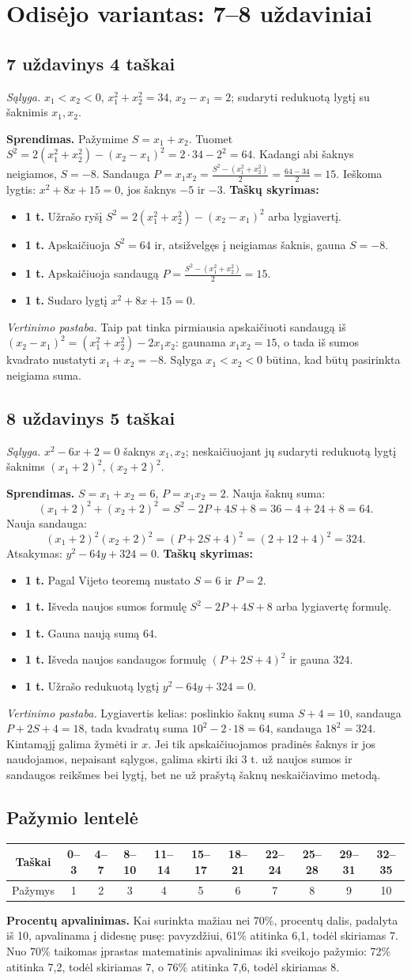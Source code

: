 \documentclass[11pt,a4paper]{article}
\newcommand{\uzd}[3]{\subsection*{#1 uždavinys \hfill #2 taškai}\textit{Sąlyga.} #3\par}
\newcommand{\kriterijai}{\textbf{Taškų skyrimas:}}
\newcommand{\balas}[2]{\item \textbf{#1 t.} #2}
\begin{document}
\section*{Odisėjo variantas: 7--8 uždaviniai}
\uzd{7}{4}{$x_1<x_2<0$, $x_1^2+x_2^2=34$, $x_2-x_1=2$; sudaryti redukuotą lygtį su šaknimis $x_1,x_2$.}
\textbf{Sprendimas.} Pažymime $S=x_1+x_2$. Tuomet $S^2=2(x_1^2+x_2^2)-(x_2-x_1)^2=2\cdot34-2^2=64$. Kadangi abi šaknys neigiamos, $S=-8$. Sandauga $P=x_1x_2=\frac{S^2-(x_1^2+x_2^2)}{2}=\frac{64-34}{2}=15$. Ieškoma lygtis: $x^2+8x+15=0$, jos šaknys $-5$ ir $-3$.
\kriterijai\begin{itemize}
\balas{1}{Užrašo ryšį $S^2=2(x_1^2+x_2^2)-(x_2-x_1)^2$ arba lygiavertį.}
\balas{1}{Apskaičiuoja $S^2=64$ ir, atsižvelgęs į neigiamas šaknis, gauna $S=-8$.}
\balas{1}{Apskaičiuoja sandaugą $P=\frac{S^2-(x_1^2+x_2^2)}{2}=15$.}
\balas{1}{Sudaro lygtį $x^2+8x+15=0$.}
\end{itemize}
\textit{Vertinimo pastaba.} Taip pat tinka pirmiausia apskaičiuoti sandaugą iš $(x_2-x_1)^2=(x_1^2+x_2^2)-2x_1x_2$: gaunama $x_1x_2=15$, o tada iš sumos kvadrato nustatyti $x_1+x_2=-8$. Sąlyga $x_1<x_2<0$ būtina, kad būtų pasirinkta neigiama suma.
\uzd{8}{5}{$x^2-6x+2=0$ šaknys $x_1,x_2$; neskaičiuojant jų sudaryti redukuotą lygtį šaknims $(x_1+2)^2,(x_2+2)^2$.}
\textbf{Sprendimas.} $S=x_1+x_2=6$, $P=x_1x_2=2$. Nauja šaknų suma:\[(x_1+2)^2+(x_2+2)^2=S^2-2P+4S+8=36-4+24+8=64.\]Nauja sandauga:\[(x_1+2)^2(x_2+2)^2=(P+2S+4)^2=(2+12+4)^2=324.\]Atsakymas: $y^2-64y+324=0$.
\kriterijai\begin{itemize}
\balas{1}{Pagal Vijeto teoremą nustato $S=6$ ir $P=2$.}
\balas{1}{Išveda naujos sumos formulę $S^2-2P+4S+8$ arba lygiavertę formulę.}
\balas{1}{Gauna naują sumą $64$.}
\balas{1}{Išveda naujos sandaugos formulę $(P+2S+4)^2$ ir gauna $324$.}
\balas{1}{Užrašo redukuotą lygtį $y^2-64y+324=0$.}
\end{itemize}
\textit{Vertinimo pastaba.} Lygiavertis kelias: poslinkio šaknų suma $S+4=10$, sandauga $P+2S+4=18$, tada kvadratų suma $10^2-2\cdot18=64$, sandauga $18^2=324$. Kintamąjį galima žymėti ir $x$. Jei tik apskaičiuojamos pradinės šaknys ir jos naudojamos, nepaisant sąlygos, galima skirti iki 3 t. už naujos sumos ir sandaugos reikšmes bei lygtį, bet ne už prašytą šaknų neskaičiavimo metodą.
\subsection*{Pažymio lentelė}
\begin{center}\small\begin{tabular}{|c|*{10}{c|}}\hline
Taškai&0--3&4--7&8--10&11--14&15--17&18--21&22--24&25--28&29--31&32--35\\\hline
Pažymys&1&2&3&4&5&6&7&8&9&10\\\hline
\end{tabular}\end{center}

\textbf{Procentų apvalinimas.} Kai surinkta mažiau nei 70\%, procentų dalis, padalyta iš 10, apvalinama į didesnę pusę: pavyzdžiui, 61\% atitinka 6,1, todėl skiriamas 7. Nuo 70\% taikomas įprastas matematinis apvalinimas iki sveikojo pažymio: 72\% atitinka 7,2, todėl skiriamas 7, o 76\% atitinka 7,6, todėl skiriamas 8.
\end{document}
